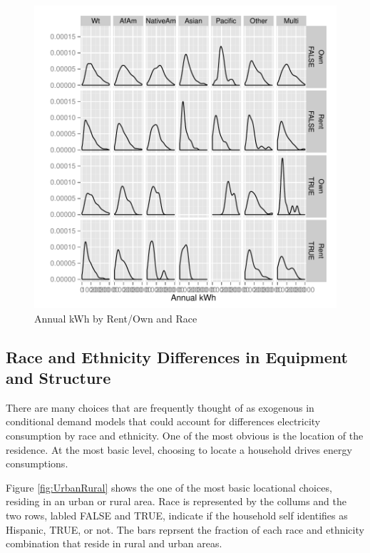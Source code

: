 \documentclass{article}
\begin{document}
\begin{figure}[htbp]
\begin{center}
\caption{Annual kWh by Rent/Own and Race}
\label{fig:kWhbyOwnRace}
\includegraphics{DraftEdwardsWoods-005}
\end{center}
\end{figure}


  \subsection{Race and Ethnicity Differences in Equipment and Structure}

There are many choices that are frequently thought of as exogenous in conditional demand models that could account for differences electricity consumption by race and ethnicity.  One of the most obvious is the location of the residence.  At the most basic level, choosing to locate a household drives energy consumptions.  

Figure 
\ref{fig:UrbanRural}
shows the one of the most basic locational choices, residing in an urban or rural area.  Race is represented by the collums and the two rows, labled FALSE and TRUE, indicate if the household self identifies as Hispanic, TRUE, or not.  The bars reprsent the fraction of each race and ethnicity combination that reside in rural and urban areas.
\end{document}
